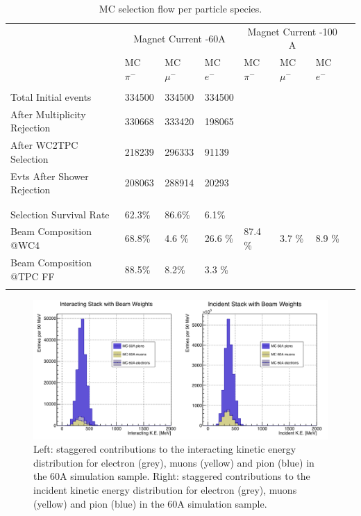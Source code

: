 \begin{table}[p]
\centering
\begin{tabular}{| l | l | l | l | l | l | l | l | }
\hline
 &  \multicolumn{3}{|c|}{Magnet Current -60A} & \multicolumn{3}{|c|}{Magnet Current -100 A}\\

                                                  & MC $\pi^-$   & MC  $ \mu^-$ & MC  $e^-$ & MC  $\pi^-$ & MC  $\mu^-$ & MC  $e^-$  \\
\hline
&  &  &  & & &\\  
Total Initial events                     & 334500  & 334500 & 334500 & & & \\
After Multiplicity Rejection        & 330668  & 333420  & 198065& & &\\
After WC2TPC Selection          & 218239  & 296333 & 91139 & & &\\
Evts After Shower Rejection     & 208063  & 288914 &  20293 & & &\\
&  &  &  & & &\\  
  \hline
&  &  &  & & &\\  
Selection Survival Rate           &62.3\% & 86.6\% & 6.1\% & & &\\
Beam Composition  @WC4      &  68.8\%   &  4.6 \%  & 26.6 \%    & 87.4 \% & 3.7 \%  & 8.9 \% \\ %
Beam Composition  @TPC FF &  88.5\%   & 8.2\%   & 3.3 \%   & & &\\
                                                  &                      &                       &                   &                       &                        &\\  
\hline
\end{tabular}
\caption{MC selection flow per particle species.}
\label{tab:MCafterCutContaminants}
\end{table}


\begin{figure}[p]
\centering
\includegraphics[width=\textwidth]{Studies/Figures/Staggered60A.png}
\caption{Left: staggered contributions to the interacting kinetic energy distribution for electron (grey), muons (yellow) and pion (blue) in the 60A simulation sample. Right: staggered contributions to the incident kinetic energy distribution for electron (grey), muons (yellow) and pion (blue) in the 60A simulation sample.  }
\label{fig:stag60A}
\end{figure}

